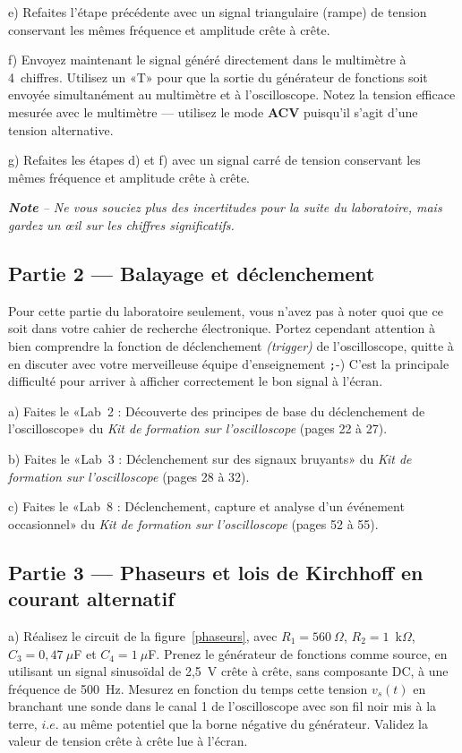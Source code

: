 \documentclass[canadien,12pt,oneside,letterpaper]{article}
\begin{document}
e) Refaites l'étape précédente avec un signal triangulaire (rampe) de tension conservant les mêmes fréquence et amplitude crête à crête.

f) Envoyez maintenant le signal généré directement dans le multimètre à 4\textonehalf~chiffres. Utilisez un «T» pour que la sortie du générateur de fonctions soit envoyée simultanément au multimètre et à l'oscilloscope. Notez la tension efficace mesurée avec le multimètre --- utilisez le mode \textbf{ACV} puisqu'il s'agit d'une tension alternative.

g) Refaites les étapes d) et f) avec un signal carré de tension conservant les mêmes fréquence et amplitude crête à crête.

\vspace{1ex}
\noindent\emph{\textbf{Note} -- Ne vous souciez plus des incertitudes pour la suite du laboratoire, mais gardez un {\oe}il sur les chiffres significatifs.}


\subsection{Partie 2 --- Balayage et déclenchement}

Pour cette partie du laboratoire seulement, vous n'avez pas à noter quoi que ce soit dans votre cahier de recherche électronique. Portez cependant attention à bien comprendre la fonction de déclenchement \textit{(trigger)} de l'oscilloscope, quitte à en discuter avec votre merveilleuse équipe d'enseignement {\texttt ;-)} C'est la principale difficulté pour arriver à afficher correctement le bon signal à l'écran.

a) Faites le «Lab~2 : Découverte des principes de base du déclenchement de l'oscilloscope» du \textit{Kit de formation sur l'oscilloscope} (pages 22 à 27).

b) Faites le «Lab~3 : Déclenchement sur des signaux bruyants» du \textit{Kit de formation sur l'oscilloscope} (pages 28 à 32).

c) Faites le «Lab~8 : Déclenchement, capture et analyse d'un événement occasionnel» du \textit{Kit de formation sur l'oscilloscope} (pages 52 à 55).


\subsection{Partie 3 --- Phaseurs et lois de Kirchhoff en courant alternatif}

a) Réalisez le circuit de la figure~\ref{phaseurs}, avec $R_1=560~\Omega$, $R_2=1$~k$\Omega$, $C_3=0,\!47~\mu$F et $C_4=1~\mu$F. Prenez le générateur de fonctions comme source, en utilisant un signal sinusoïdal de 2,5~V crête à crête, sans composante DC, à une fréquence de 500~Hz. Mesurez en fonction du temps cette tension $v_s(t)$ en branchant une sonde dans le canal 1 de l'oscilloscope avec son fil noir mis à la terre, $i.e.$ au même potentiel que la borne négative du générateur. Validez la valeur de tension crête à crête lue à l'écran.
\end{document}

